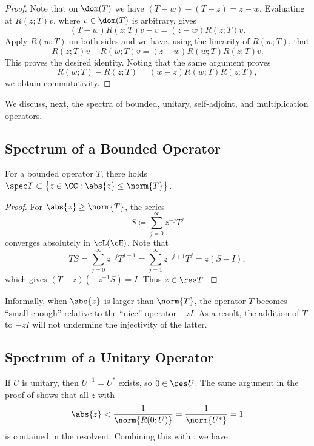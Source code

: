 \documentclass[oneside,reqno,letterpaper]{amsart}
\begin{document}
\begin{proof}
  Note that on \(\dom(T)\) we have \((T - w) - (T - z) = z - w\). 
  Evaluating at \(R(z; T) v\), where \(v \in \dom(T)\) is arbitrary, gives 
  \[
    (T - w) R(z; T) v - v = (z - w) R(z; T) v . 
  \] 
  Apply \(R(w; T)\) on both sides and we have, using the linearity of \(R(w; T)\), that 
  \[
    R(z; T) v - R(w; T) v = (z - w) R(w; T) R(z; T) v . 
  \] 
  This proves the desired identity. 
  Noting that the same argument proves
  \[
    R(w; T) - R(z; T) = (w - z) R(w; T) R(z; T) , 
  \] 
  we obtain commutativity. 
\end{proof}



We discuss, next, the spectra of bounded, unitary, self-adjoint, and multiplication operators. 

\subsection{Spectrum of a Bounded Operator}

\begin{theorem}
\label{thm:bounded-spectrum}
  For a bounded operator \(T\), there holds
  \(\spec T \subset \big\{z \in \CC: \abs{z} \leq \norm{T}\big\}\). 
\end{theorem}
\begin{proof}
  For \(\abs{z} \geq \norm{T}\), the series 
  \[
    S \coloneqq \sum_{j=0}^{\infty} z^{-j} T^j
  \] 
  converges absolutely in \(\cL(\cH)\). 
  Note that 
  \[
  TS 
  = \sum_{j=0}^{\infty} z^{-j} T^{j + 1}
  = \sum_{j=1}^{\infty} z^{-j + 1} T^{j}
  = z (S - I), 
  \] 
  which gives \((T - z) \left( -z^{-1} S \right) = I\). 
  Thus \(z \in \res T\). 
\end{proof}

Informally, when \(\abs{z}\) is larger than \(\norm{T}\), the operator \(T\) becomes ``small enough'' relative to the ``nice'' operator \(-zI\).
As a result, the addition of \(T\) to \(-zI\) will not undermine the injectivity of the latter. 


\subsection{Spectrum of a Unitary Operator}

If \(U\) is unitary, then \(U^{-1} = U^*\) exists, so \(0 \in \res U\). 
The same argument in the proof of  shows that all \(z\) with 
\[
  \abs{z} < \frac{1}{\norm{R(0; U)}} = \frac{1}{\norm{U^*}} = 1
\] 
is contained in the resolvent. 
Combining this with , we have:
\end{document}
